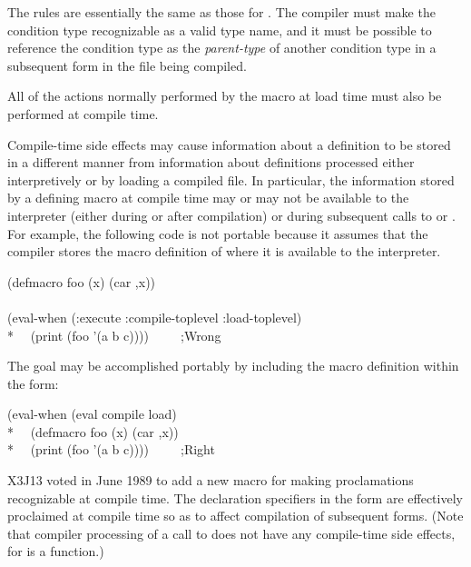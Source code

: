 \begin{newer}
\begin{flushdesc}
\item[\cdf{define-condition}]
The rules are essentially the same as those for
    . The compiler must make the condition type recognizable as a
    valid type name, and it must be possible to reference the condition
    type as the {\it parent-type} of another condition type in a subsequent
     form in the file being compiled.

\item[\cdf{defpackage}]
 All of the actions normally performed by the  macro at load
    time must also be performed at compile time.
\end{flushdesc}

Compile-time side effects may cause information about a
    definition to be stored in a different manner from
information about definitions
    processed either interpretively or by loading
    a compiled file.
    In particular, the information stored by a defining macro at
    compile time may or may not be available to the interpreter (either
    during or after compilation) or during subsequent calls to  or
    .  For example, the following code is not portable because
    it assumes that the compiler stores the macro definition of  where
    it is available to the interpreter.
\begin{lisp}
(defmacro foo (x) {\Xbq}(car ,x)) \\
\\
(eval-when (:execute :compile-toplevel :load-toplevel) \\*
~~(print (foo '(a b c))))~~~~~;{\rm Wrong}
\end{lisp}
    The goal may be accomplished portably by including the macro
    definition within the  form:
\begin{lisp}  
(eval-when (eval compile load) \\*
~~(defmacro foo (x) {\Xbq}(car ,x)) \\*
~~(print (foo '(a b c))))~~~~~;{\rm Right}
\end{lisp}

\begin{flushdesc}
\item[\cdf{declaim}]

X3J13 voted in June 1989 
to add a new macro  for making proclamations recognizable
at compile time.  The declaration specifiers in the  form
are effectively proclaimed at compile time so as to affect
compilation of subsequent forms.  (Note that compiler processing
of a call to 
does not have any compile-time side effects, for 
is a function.)
\end{flushdesc}


\end{newer}
